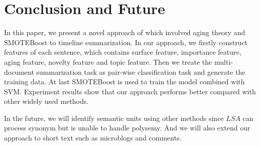 \documentclass[print]{jicspack}
\begin{document}
%
\section{Conclusion and Future}
%

In this paper, we present a novel approach of which involved aging theory and SMOTEBoost to timeline summarization. In our approach, we firstly construct features of each sentence, which contains surface feature, importance feature, aging feature, novelty feature and topic feature. Then we treate the multi-document summarization task as pair-wise classification task and generate the training data. At last SMOTEBoost is used to train the model combined with SVM. Experiment results show that our approach performs better compared with other widely used methods.

In the future, we will identify semantic units using other methods since $LSA$ can process synonym but is unable to handle polysemy. And we will also extend our approach to short text such as microblogs and comments.
\end{document}
